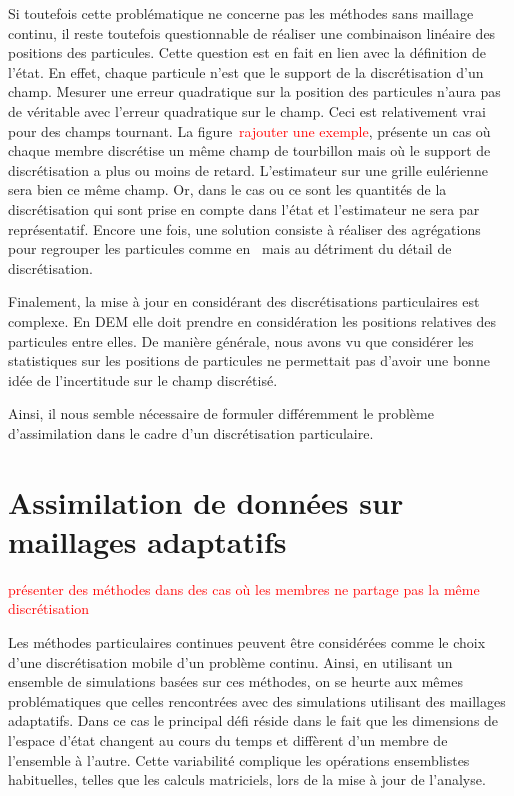 Si toutefois cette problématique ne concerne pas les méthodes sans maillage continu, il reste toutefois questionnable de réaliser une combinaison linéaire des positions des particules. Cette question est en fait en lien avec la définition de l'état.
En effet, chaque particule n'est que le support de la discrétisation d'un champ. Mesurer une erreur quadratique sur la position des particules n'aura pas de véritable avec l'erreur quadratique sur le champ.
Ceci est relativement vrai pour des champs tournant. La figure~\textcolor{red}{rajouter une exemple}, présente un cas où chaque membre discrétise un même champ de tourbillon mais où le support de discrétisation a plus ou moins de retard. L'estimateur sur une grille eulérienne sera bien ce même champ. Or, dans le cas ou ce sont les quantités de la discrétisation qui sont prise en compte dans l'état et l'estimateur ne sera par représentatif.
Encore une fois, une solution consiste à réaliser des agrégations pour regrouper les particules comme en~\cite{chen_superfloe_2022,darakananda_data-assimilated_2018} mais au détriment du détail de discrétisation.

Finalement, la mise à jour en considérant des discrétisations particulaires est complexe. En DEM elle doit prendre en considération les positions relatives des particules entre elles. De manière générale, nous avons vu que considérer les statistiques sur les positions de particules ne permettait pas d'avoir une bonne idée de l'incertitude sur le champ discrétisé.

Ainsi, il nous semble nécessaire de formuler différemment le problème d'assimilation dans le cadre d'un discrétisation particulaire.

\section{Assimilation de données sur maillages adaptatifs}

\textcolor{red}{présenter des méthodes dans des cas où les membres ne partage pas la même discrétisation}

Les méthodes particulaires continues peuvent être considérées comme le choix d'une discrétisation mobile d'un problème continu. Ainsi, en utilisant un ensemble de simulations basées sur ces méthodes, on se heurte aux mêmes problématiques que celles rencontrées avec des simulations utilisant des maillages adaptatifs.
Dans ce cas le principal défi réside dans le fait que les dimensions de l'espace d'état changent au cours du temps et diffèrent d'un membre de l'ensemble à l'autre. Cette variabilité complique les opérations ensemblistes habituelles, telles que les calculs matriciels, lors de la mise à jour de l'analyse.

